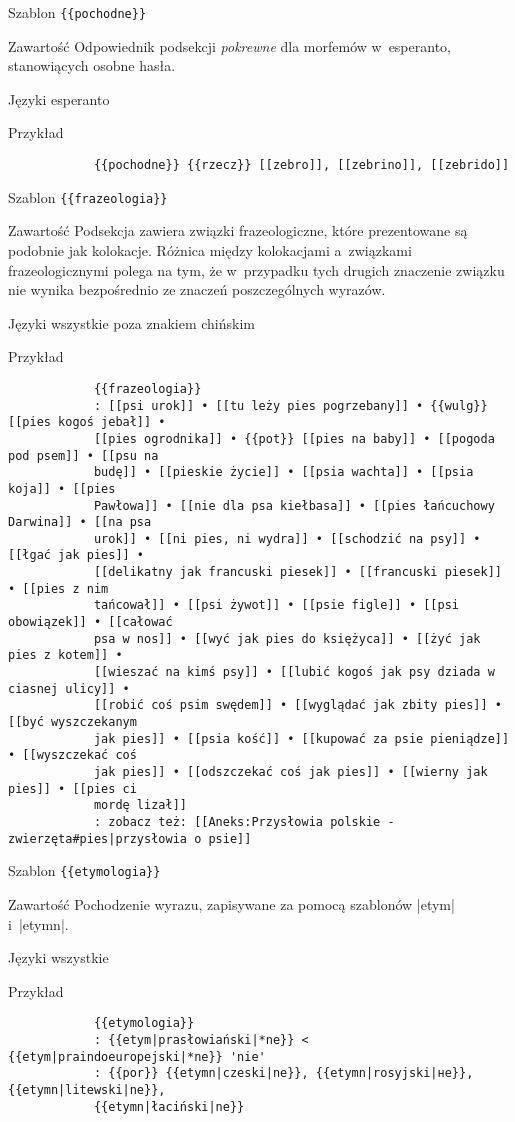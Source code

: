 \spacer
\begin{opis}
	\item[Szablon] \verb|{{pochodne}}|
	\item[Zawartość] Odpowiednik podsekcji \emph{pokrewne} dla morfemów w~esperanto, stanowiących osobne hasła.
	\item[Języki] esperanto
	\item[Przykład]
		\begin{verbatim}
			{{pochodne}} {{rzecz}} [[zebro]], [[zebrino]], [[zebrido]]
		\end{verbatim}
\end{opis}
\spacer
\begin{opis}
	\item[Szablon] \verb|{{frazeologia}}|
	\item[Zawartość] Podsekcja zawiera związki frazeologiczne, które prezentowane są podobnie jak kolokacje. Różnica między kolokacjami a~związkami frazeologicznymi polega na tym, że w~przypadku tych drugich znaczenie związku nie wynika bezpośrednio ze znaczeń poszczególnych wyrazów.
	\item[Języki] wszystkie poza znakiem chińskim
	\item[Przykład]
		\begin{verbatim}
			{{frazeologia}}
			: [[psi urok]] • [[tu leży pies pogrzebany]] • {{wulg}} [[pies kogoś jebał]] •
			[[pies ogrodnika]] • {{pot}} [[pies na baby]] • [[pogoda pod psem]] • [[psu na
			budę]] • [[pieskie życie]] • [[psia wachta]] • [[psia koja]] • [[pies
			Pawłowa]] • [[nie dla psa kiełbasa]] • [[pies łańcuchowy Darwina]] • [[na psa
			urok]] • [[ni pies, ni wydra]] • [[schodzić na psy]] • [[łgać jak pies]] •
			[[delikatny jak francuski piesek]] • [[francuski piesek]] • [[pies z nim
			tańcował]] • [[psi żywot]] • [[psie figle]] • [[psi obowiązek]] • [[całować
			psa w nos]] • [[wyć jak pies do księżyca]] • [[żyć jak pies z kotem]] •
			[[wieszać na kimś psy]] • [[lubić kogoś jak psy dziada w ciasnej ulicy]] •
			[[robić coś psim swędem]] • [[wyglądać jak zbity pies]] • [[być wyszczekanym
			jak pies]] • [[psia kość]] • [[kupować za psie pieniądze]] • [[wyszczekać coś
			jak pies]] • [[odszczekać coś jak pies]] • [[wierny jak pies]] • [[pies ci
			mordę lizał]]
			: zobacz też: [[Aneks:Przysłowia polskie - zwierzęta#pies|przysłowia o psie]]
		\end{verbatim}
\end{opis}
\spacer
\begin{opis}
	\item[Szablon] \verb|{{etymologia}}|
	\item[Zawartość] Pochodzenie wyrazu, zapisywane za pomocą szablonów \kod|{{etym}}| i~\kod|{{etymn}}|.
	\item[Języki] wszystkie
	\item[Przykład]
		\begin{verbatim}
			{{etymologia}}
			: {{etym|prasłowiański|*ne}} < {{etym|praindoeuropejski|*ne}} 'nie'
			: {{por}} {{etymn|czeski|ne}}, {{etymn|rosyjski|не}}, {{etymn|litewski|ne}},
			{{etymn|łaciński|ne}}
		\end{verbatim}
\end{opis}
